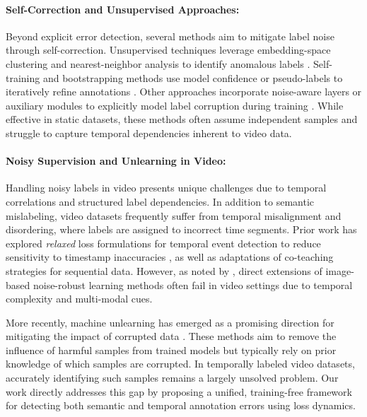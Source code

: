 \documentclass{article}
\theoremstyle{plain}
\theoremstyle{definition}
\theoremstyle{remark}
\begin{document}
\vspace{-0.6em}
\paragraph{Self-Correction and Unsupervised Approaches:}
Beyond explicit error detection, several methods aim to mitigate label noise through self-correction. Unsupervised techniques leverage embedding-space clustering and nearest-neighbor analysis to identify anomalous labels \cite{Li_2021_ICCV}. Self-training and bootstrapping methods use model confidence or pseudo-labels to iteratively refine annotations \cite{label_errors_learning_4,label_errors_learning_6,label_errors_learning_7}. Other approaches incorporate noise-aware layers or auxiliary modules to explicitly model label corruption during training \cite{label_errors_learning_5}. While effective in static datasets, these methods often assume independent samples and struggle to capture temporal dependencies inherent to video data.

\vspace{-0.6em}
\paragraph{Noisy Supervision and Unlearning in Video:}
Handling noisy labels in video presents unique challenges due to temporal correlations and structured label dependencies. In addition to semantic mislabeling, video datasets frequently suffer from temporal misalignment and disordering, where labels are assigned to incorrect time segments. Prior work has explored \textit{relaxed} loss formulations for temporal event detection to reduce sensitivity to timestamp inaccuracies \cite{label_errors_learning_3}, as well as adaptations of co-teaching strategies for sequential data. However, as noted by \cite{label_errors_learning_10}, direct extensions of image-based noise-robust learning methods often fail in video settings due to temporal complexity and multi-modal cues.

More recently, machine unlearning has emerged as a promising direction for mitigating the impact of corrupted data \cite{kodge2025sap, goel2024corrective, kurmanji2023towards}. These methods aim to remove the influence of harmful samples from trained models but typically rely on prior knowledge of which samples are corrupted. In temporally labeled video datasets, accurately identifying such samples remains a largely unsolved problem. Our work directly addresses this gap by proposing a unified, training-free framework for detecting both semantic and temporal annotation errors using loss dynamics.
\end{document}
